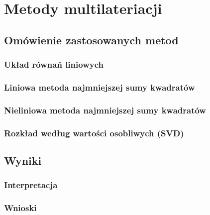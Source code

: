 \chapter{Metody multilateriacji}

\section{Omówienie zastosowanych metod}

\subsection{Układ równań liniowych}

\subsection{Liniowa metoda najmniejszej sumy kwadratów}

\subsection{Nieliniowa metoda najmniejszej sumy kwadratów}

\subsection{Rozkład według wartości osobliwych (SVD)}

\section{Wyniki}

\subsection{Interpretacja}

\subsection{Wnioski}